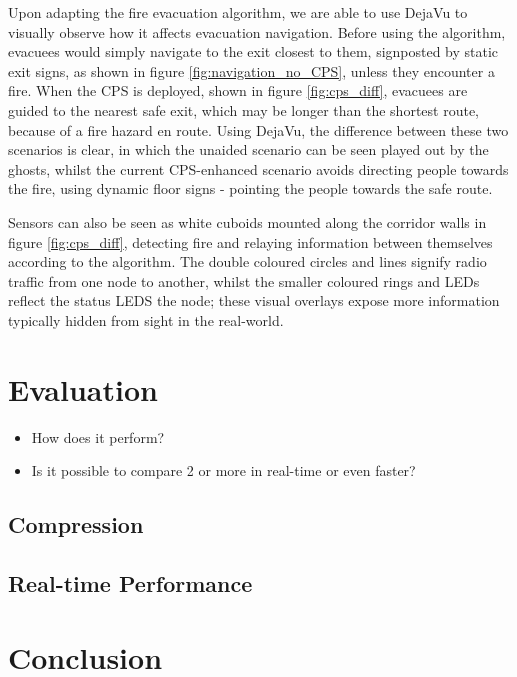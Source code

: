 Upon adapting the fire evacuation algorithm, we are able to use DejaVu to visually observe how it affects evacuation navigation. Before using the algorithm, evacuees would simply navigate to the exit closest to them, signposted by static exit signs, as shown in figure \ref{fig:navigation_no_CPS}, unless they encounter a fire. When the CPS is deployed, shown in figure \ref{fig:cps_diff}, evacuees are guided to the nearest safe exit, which may be longer than the shortest route, because of a fire hazard en route. Using DejaVu, the difference between these two scenarios is clear, in which the unaided scenario can be seen played out by the ghosts, whilst the current CPS-enhanced scenario avoids directing people towards the fire, using dynamic floor signs - pointing the people towards the safe route.

Sensors can also be seen as white cuboids mounted along the corridor walls in figure \ref{fig:cps_diff}, detecting fire and relaying information between themselves according to the algorithm. The double coloured circles and lines signify radio traffic from one node to another, whilst the smaller coloured rings and LEDs reflect the status LEDS the node; these visual overlays expose more information typically hidden from sight in the real-world.

\section{Evaluation}
\label{sec:Evaluation}
\begin{itemize}
  \item How does it perform?
  \item Is it possible to compare 2 or more in real-time or even faster?
\end{itemize}

\subsection{Compression} %
\label{sub:compression}


\subsection{Real-time Performance} %
\label{sub:real_time_performance}


\section{Conclusion}
\label{sec:Conclusion}
